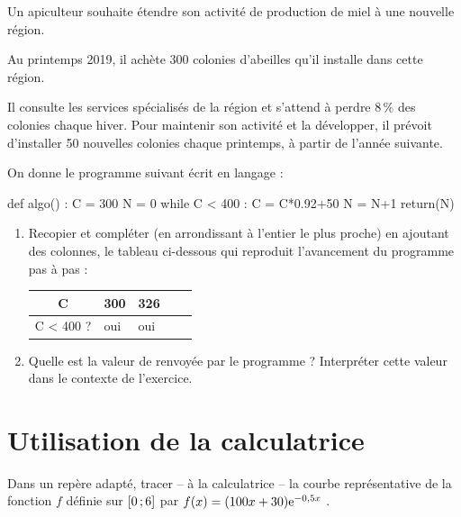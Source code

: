 \documentclass[a4paper,11pt]{article}
\begin{document}
\begin{cexercice}[ E3 : en contexte]
Un apiculteur souhaite étendre son activité de production de miel à une nouvelle région.

Au printemps 2019, il achète $300$ colonies d’abeilles qu’il installe dans cette région.

Il consulte les services spécialisés de la région et s’attend à perdre 8\,\% des colonies chaque hiver. Pour maintenir son activité et la développer, il prévoit d’installer 50 nouvelles colonies chaque printemps, à partir de l’année suivante.

On donne le programme suivant écrit en langage \calgpython{} :
\begin{envcodepythontex}[largeur=8cm,lignes,centre=true]
	def algo() :
		C = 300
		N = 0
		while C < 400 :
			C = C*0.92+50
			N = N+1
		return(N)
\end{envcodepythontex}

\begin{enumerate}
	\item Recopier et compléter (en arrondissant à l'entier le plus proche) en ajoutant des colonnes, le tableau ci-dessous qui reproduit l’avancement du programme pas à pas :
	
	\begin{center}
		\begin{tabularx}{12cm}{|c|Y|Y|Y|Y}
			\hline
			C 					&300	& 326	& \dotfill 	& \\ \hline
			\og C < 400 \fg{} ?	& oui	& oui 	& \dotfill	& \\ \hline
		\end{tabularx}
	\end{center}
	\item Quelle est la valeur de  renvoyée par le programme ? Interpréter cette valeur dans le contexte de l’exercice.
\end{enumerate}
\end{cexercice}

\pagebreak

\section{Utilisation de la calculatrice}

\begin{cexercice}[ F1 : tracé]
Dans un repère adapté, tracer -- à la calculatrice -- la courbe représentative de la fonction $f$ définie sur $\mbox{\ensuremath{\left[0\mathpunct{};6\right]}}$ par $f(x)=(100x+30){\rm e}^{-0,5x}$ .
\end{cexercice}
\end{document}
